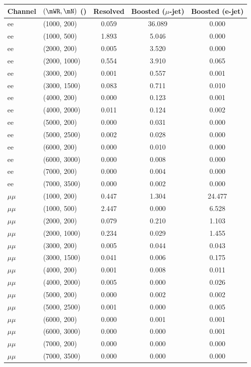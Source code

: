 \begin{tabular}{llccc}
\hline
Channel & $(\mWR, \mN)$ (\GeVns{}) & Resolved & Boosted ($\mu$-jet) & Boosted (e-jet) \\
\hline
ee & (1000, 200) & 0.059 & 36.089 & 0.000 \\
ee & (1000, 500) & 1.893 & 5.046 & 0.000 \\
ee & (2000, 200) & 0.005 & 3.520 & 0.000 \\
ee & (2000, 1000) & 0.554 & 3.910 & 0.065 \\
ee & (3000, 200) & 0.001 & 0.557 & 0.001 \\
ee & (3000, 1500) & 0.083 & 0.711 & 0.010 \\
ee & (4000, 200) & 0.000 & 0.123 & 0.001 \\
ee & (4000, 2000) & 0.011 & 0.124 & 0.002 \\
ee & (5000, 200) & 0.000 & 0.031 & 0.000 \\
ee & (5000, 2500) & 0.002 & 0.028 & 0.000 \\
ee & (6000, 200) & 0.000 & 0.010 & 0.000 \\
ee & (6000, 3000) & 0.000 & 0.008 & 0.000 \\
ee & (7000, 200) & 0.000 & 0.004 & 0.000 \\
ee & (7000, 3500) & 0.000 & 0.002 & 0.000 \\
\hline
$\mu\mu$ & (1000, 200) & 0.447 & 1.304 & 24.477 \\
$\mu\mu$ & (1000, 500) & 2.447 & 0.000 & 6.528 \\
$\mu\mu$ & (2000, 200) & 0.079 & 0.210 & 1.103 \\
$\mu\mu$ & (2000, 1000) & 0.234 & 0.029 & 1.455 \\
$\mu\mu$ & (3000, 200) & 0.005 & 0.044 & 0.043 \\
$\mu\mu$ & (3000, 1500) & 0.041 & 0.006 & 0.175 \\
$\mu\mu$ & (4000, 200) & 0.001 & 0.008 & 0.011 \\
$\mu\mu$ & (4000, 2000) & 0.005 & 0.000 & 0.026 \\
$\mu\mu$ & (5000, 200) & 0.000 & 0.002 & 0.002 \\
$\mu\mu$ & (5000, 2500) & 0.001 & 0.000 & 0.005 \\
$\mu\mu$ & (6000, 200) & 0.000 & 0.001 & 0.001 \\
$\mu\mu$ & (6000, 3000) & 0.000 & 0.000 & 0.001 \\
$\mu\mu$ & (7000, 200) & 0.000 & 0.000 & 0.000 \\
$\mu\mu$ & (7000, 3500) & 0.000 & 0.000 & 0.000 \\
\hline
\end{tabular}
